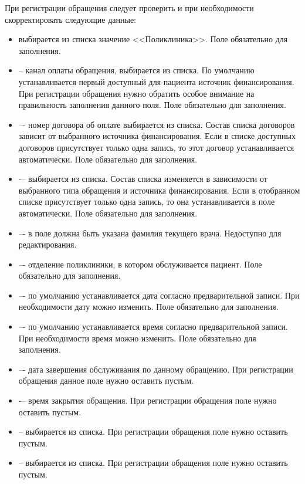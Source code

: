 При регистрации обращения следует проверить и при необходимости скорректировать следующие данные:
\begin{itemize}
	\item {} выбирается из списка значение <<Поликлиника>>. Поле обязательно для заполнения.
	\item {} – канал оплаты обращения, выбирается из списка. По умолчанию устанавливается первый доступный для пациента источник финансирования. При регистрации обращения нужно обратить особое внимание на правильность заполнения данного поля. Поле обязательно для заполнения.
	\item {} –- номер договора об оплате выбирается из списка. Состав списка договоров зависит от выбранного источника финансирования. Если в списке доступных договоров присутствует только одна запись, то этот договор устанавливается автоматически. Поле обязательно для заполнения.
	\item {} -– выбирается из списка. Состав списка изменяется в зависимости от выбранного типа обращения и источника финансирования. Если в отобранном списке присутствует только одна запись, то она устанавливается в поле автоматически. Поле обязательно для заполнения.
	\item {} –- в поле должна быть указана фамилия текущего врача. Недоступно для редактирования.
	\item {} –- отделение поликлиники, в котором обслуживается пациент. Поле обязательно для заполнения.
	\item {} –- по умолчанию устанавливается дата согласно предварительной записи. При необходимости дату можно изменить. Поле обязательно для заполнения.
	\item {} –- по умолчанию устанавливается время согласно предварительной записи. При необходимости время можно изменить. Поле обязательно для заполнения.
	\item {} –- дата завершения обслуживания по данному обращению. При регистрации обращения данное поле нужно оставить пустым.
	\item {} -– время закрытия обращения. При регистрации обращения поле нужно оставить пустым.
	\item {} -- выбирается из списка. При регистрации обращения поле нужно оставить пустым.
	\item {} -- выбирается из списка. При регистрации обращения поле нужно оставить пустым.
\end{itemize}

